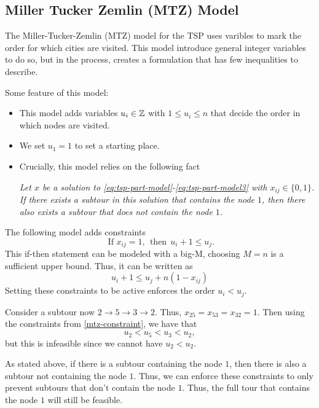 \subsection{Miller Tucker Zemlin (MTZ) Model}
The Miller-Tucker-Zemlin (MTZ) model for the TSP uses varibles to mark the order for which cities are visited.  This model introduce general integer variables to do so, but in the process, creates a formulation that has few inequalities to describe.

Some feature of this model:
\begin{itemize}
\item This model adds variables $u_i \in {\mathbb{Z}}$ with $1 \leq u_i \leq n$ that decide the order in which nodes are visited.
\item We set $u_1 = 1$ to set a starting place.
\item Crucially, this model relies on the following fact\\
\begin{center}
\emph{
Let  $x$ be a solution to \eqref{eq:tsp-part-model}-\eqref{eq:tsp-part-model3} with $x_{ij} \in \{0,1\}$.  If there exists a subtour in this solution that contains the node $1$, then there also exists a subtour that does not contain the node $1$.}
\end{center}
\end{itemize}

The following model adds constraints
\begin{equation}
\text{ If } x_{ij} = 1, \ \ \text{then} \ \ u_i + 1 \leq u_j.
\end{equation}
This if-then statement can be modeled with a big-M, choosing $M = n$ is a sufficient upper bound.  Thus, it can be written as 
\begin{equation}
\label{mtz-constraint}
u_i + 1 \leq u_j + n(1-x_{ij})
\end{equation}
Setting these constraints to be active enforces the order $u_i < u_j$.    

Consider a subtour now  $2 \to 5 \to 3 \to 2$.  Thus, $x_{25} = x_{53} = x_{32} = 1$.  Then using the constraints from \eqref{mtz-constraint}, we have that 
\begin{equation}
u_2 < u_5 < u_3 < u_2,
\end{equation}
but this is infeasible since we cannot have $u_2 < u_2$.  

As stated above, if there is a subtour containing the node $1$, then there is also a subtour not containing the node $1$.  Thus, we can enforce these constraints to only prevent subtours that don't contain the node $1$.  Thus, the full tour that contains the node $1$ will still be feasible.


